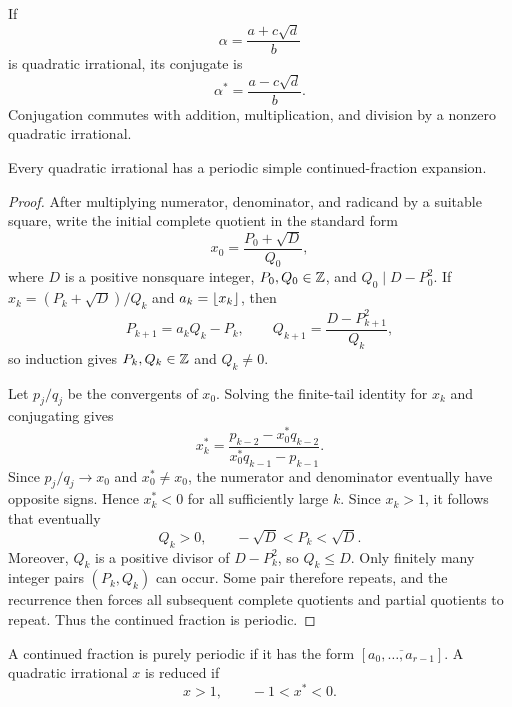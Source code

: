 \begin{de}
If
\[
 \alpha=\frac{a+c\sqrt d}{b}
\]
is quadratic irrational, its conjugate is
\[
 \alpha^*=\frac{a-c\sqrt d}{b}.
\]
Conjugation commutes with addition, multiplication, and division by a nonzero quadratic irrational.
\end{de}

\begin{thm}[Lagrange]
Every quadratic irrational has a periodic simple continued-fraction expansion.
\end{thm}
\begin{proof}
After multiplying numerator, denominator, and radicand by a suitable square, write the initial complete quotient in the standard form
\[
 x_0=\frac{P_0+\sqrt D}{Q_0},
\]
where $D$ is a positive nonsquare integer, $P_0,Q_0\in\mathbb{Z}$, and
$Q_0\mid D-P_0^2$.  If
$x_k=(P_k+\sqrt D)/Q_k$ and $a_k=\left\lfloor x_k \right\rfloor$, then
\[
 P_{k+1}=a_kQ_k-P_k,
 \qquad
 Q_{k+1}=\frac{D-P_{k+1}^2}{Q_k},
\]
so induction gives $P_k,Q_k\in\mathbb{Z}$ and $Q_k\ne0$.

Let $p_j/q_j$ be the convergents of $x_0$.  Solving the finite-tail identity for $x_k$ and conjugating gives
\[
 x_k^*=\frac{p_{k-2}-x_0^*q_{k-2}}{x_0^*q_{k-1}-p_{k-1}}.
\]
Since $p_j/q_j\to x_0$ and $x_0^*\ne x_0$, the numerator and denominator eventually have opposite signs.  Hence $x_k^*<0$ for all sufficiently large $k$.  Since $x_k>1$, it follows that eventually
\[
 Q_k>0,
 \qquad
 -\sqrt D<P_k<\sqrt D.
\]
Moreover, $Q_k$ is a positive divisor of $D-P_k^2$, so $Q_k\le D$.  Only finitely many integer pairs $(P_k,Q_k)$ can occur.  Some pair therefore repeats, and the recurrence then forces all subsequent complete quotients and partial quotients to repeat.  Thus the continued fraction is periodic.
\end{proof}

\begin{de}
A continued fraction is purely periodic if it has the form
$[\overbar{a_0,\ldots,a_{r-1}}]$.  A quadratic irrational $x$ is reduced if
\[
 x>1,
 \qquad
 -1<x^*<0.
\]
\end{de}

